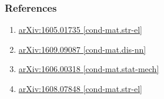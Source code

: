\documentclass{beamer}
\begin{document}
\begin{frame}
	\frametitle{References}
	\begin{enumerate}
		\item \href{https://arxiv.org/pdf/1605.01735.pdf}{arXiv:1605.01735 [cond-mat.str-el]}
		\item \href{https://arxiv.org/abs/1609.09087.pdf}{arXiv:1609.09087 [cond-mat.dis-nn]}
		\item \href{https://arxiv.org/abs/1606.00318.pdf}{arXiv:1606.00318 [cond-mat.stat-mech]}
		\item \href{https://arxiv.org/abs/1608.07848.pdf}{arXiv:1608.07848 [cond-mat.str-el]}
	\end{enumerate}
\end{frame}





\end{document}
